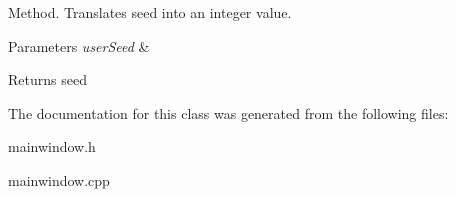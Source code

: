 Method. Translates seed into an integer value. 
\begin{DoxyParams}{Parameters}
{\em user\+Seed} & \\
\hline
\end{DoxyParams}
\begin{DoxyReturn}{Returns}
seed 
\end{DoxyReturn}


The documentation for this class was generated from the following files\+:\begin{DoxyCompactItemize}
\item 
mainwindow.\+h\item 
mainwindow.\+cpp\end{DoxyCompactItemize}
